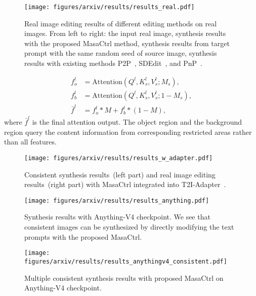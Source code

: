 \documentclass[10pt,twocolumn,letterpaper]{article}
\begin{document}
\begin{figure*}[!t]
    \centering
    \texttt{[image: figures/arxiv/results/results\_real.pdf]}
    \caption{Real image editing results of different editing methods on real images. From left to right: the input real image, synthesis results with the proposed MasaCtrl method, synthesis results from target prompt with the same random seed of source image, synthesis results with existing methods    P2P~\cite{hertz2022prompt}, SDEdit~\cite{meng2021sdedit}, and PnP~\cite{tumanyan2022plug}. }
    \label{fig:results_real}
\end{figure*}


\begin{align}
    \label{eq:mask_attn}
    f^l_{o} &= \text{Attention}(Q^l, K^l_{s}, V^l_{s}; M_s), \\
    f^l_{b} &= \text{Attention}(Q^l, K^l_{s}, V^l_{s}; 1 - M_s), \\
    \bar{f}^l &= f^l_{o} * M + f^l_{b} * (1 - M),
\end{align}
where $\bar{f}^l$ is the final attention output.
The object region and the background region query the content information from corresponding restricted areas rather than all features.

\begin{figure*}
    \centering
    \texttt{[image: figures/arxiv/results/results\_w\_adapter.pdf]}
    \caption{Consistent synthesis results~(left part) and real image editing results~(right part) with MasaCtrl integrated into T2I-Adapter~\cite{mou2023t2i}. }
    \label{fig:results_adapter}
\end{figure*}

\begin{figure*}
    \centering
    \texttt{[image: figures/arxiv/results/results\_anything.pdf]}
    \caption{Synthesis results with Anything-V4 checkpoint. We see that consistent images can be synthesized by directly modifying the text prompts with the proposed MasaCtrl. }
    \label{fig:results_angthing}
\end{figure*}

\begin{figure*}
    \centering
    \texttt{[image: figures/arxiv/results/results\_anythingv4\_consistent.pdf]}
    \caption{Multiple consistent synthesis results with proposed MasaCtrl on Anything-V4 checkpoint. }
    \label{fig:coherent_synthesis}
\end{figure*}
\end{document}
